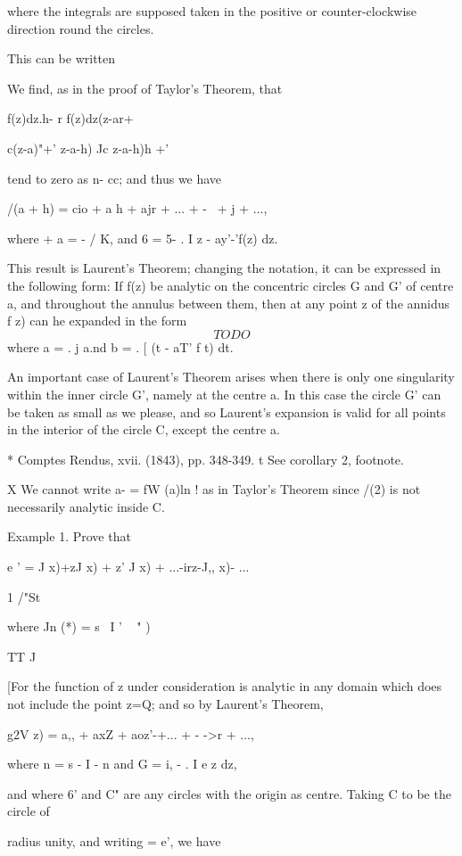 {{where the integrals are supposed taken in the positive or
counter-clockwise direction round the circles.

This can be written

We find, as in the proof of Taylor's Theorem, that

f(z)dz.h- r f(z)dz(z-ar+

c(z-a)"+' z-a-h) Jc z-a-h)h +'

tend to zero as n- cc; and thus we have

/(a + h) = cio + a h + ajr + ... + -~ + j + ...,

where + a = - / K, and 6 = 5- . I z - ay'-'f(z) dz.

This result is Laurent's Theorem; changing the notation, it can be
expressed in the following form: If f(z) be analytic on the concentric
circles G and G' of centre a, and throughout the annulus between them,
then at any point z of the annidus f z) can he expanded in the form
$$
TODO
$$
where a = . j a.nd b = . [ (t - aT' f t) dt.

An important case of Laurent's Theorem arises when there is only one
singularity within the inner circle G', namely at the centre a. In
this case the circle G' can be taken as small as we please, and so
Laurent's expansion is valid for all points in the interior of the
circle C, except the centre a.

* Comptes Rendus, xvii. (1843), pp. 348-349. t See corollary 2,
footnote.

X We cannot write a- = fW (a)ln ! as in Taylor's Theorem since /(2) is
not necessarily analytic inside C.

%
%

Example 1. Prove that

e ' = J x)+zJ x) + z' J x) + ...-irz-J,, x)- ...

1 /"St

where Jn (*) = s~ I ' ~ " ) 

 TT J

[For the function of z under consideration is analytic in any domain
which does not include the point z=Q; and so by Laurent's Theorem,

g2V z) = a,, + axZ + aoz'-+... + - ->r + ...,

where n = s - I - n and G = i, - . I e z dz,

and where 6' and C" are any circles with the origin as centre. Taking
C to be the circle of

radius unity, and writing = e', we have

}}
